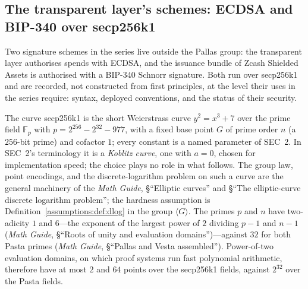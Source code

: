 \documentclass[11pt,a4paper]{article}
\theoremstyle{definition}
\theoremstyle{remark}
\newcommand{\F}{\ensuremath{\mathbb{F}}}
\begin{document}
\subsection{The transparent layer's schemes: ECDSA and BIP-340 over
secp256k1}\label{signatures:subsec:transparent}

Two signature schemes in the series live outside the Pallas group:
the transparent layer authorises spends with ECDSA, and the issuance
bundle of Zcash Shielded Assets is authorised with a BIP-340 Schnorr
signature. Both run over secp256k1 and are recorded, not constructed
from first principles, at the level their uses in the series require:
syntax, deployed conventions, and the status of their security.

The curve secp256k1 is the short Weierstrass curve
\(y^{2} = x^{3} + 7\) over the prime field \(\F_{p}\) with
\(p = 2^{256} - 2^{32} - 977\), with a fixed base point \(G\) of
prime order \(n\) (a \(256\)-bit prime) and cofactor \(1\); every
constant is a named parameter of SEC~2. In SEC~2's terminology it is
a \emph{Koblitz curve}, one with \(a = 0\), chosen for implementation
speed; the choice plays no role in what follows. The group
law, point encodings, and the discrete-logarithm problem on such a
curve are the general machinery of the \emph{Math Guide},
\S``Elliptic curves'' and \S``The elliptic-curve discrete logarithm
problem''; the hardness assumption is
Definition~\ref{assumptions:def:dlog} in the group
\(\langle G \rangle\). The primes \(p\) and \(n\) have two-adicity \(1\)
and \(6\)---the exponent of the largest power of \(2\) dividing \(p - 1\)
and \(n - 1\) (\emph{Math Guide}, \S``Roots of unity and evaluation
domains'')---against \(32\) for both Pasta primes
(\emph{Math Guide}, \S``Pallas and Vesta assembled''). Power-of-two
evaluation domains, on which proof systems run fast polynomial
arithmetic, therefore have at most \(2\) and \(64\) points over the
secp256k1 fields, against \(2^{32}\) over the Pasta fields.
\end{document}
